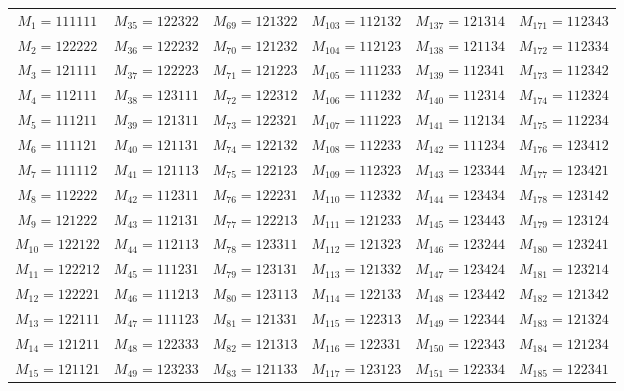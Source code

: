 \documentclass{svmult}
\begin{document}
\begin{center}
\begin{tabular}{cccccc} \hline
  $M_{1} = 111111$ &  $M_{35} = 122322$ &  $M_{69} = 121322$ & $M_{103} = 112132$ & $M_{137} = 121314$ & $M_{171} = 112343$ \\
  $M_{2} = 122222$ &  $M_{36} = 122232$ &  $M_{70} = 121232$ & $M_{104} = 112123$ & $M_{138} = 121134$ & $M_{172} = 112334$ \\
  $M_{3} = 121111$ &  $M_{37} = 122223$ &  $M_{71} = 121223$ & $M_{105} = 111233$ & $M_{139} = 112341$ & $M_{173} = 112342$ \\
  $M_{4} = 112111$ &  $M_{38} = 123111$ &  $M_{72} = 122312$ & $M_{106} = 111232$ & $M_{140} = 112314$ & $M_{174} = 112324$ \\
  $M_{5} = 111211$ &  $M_{39} = 121311$ &  $M_{73} = 122321$ & $M_{107} = 111223$ & $M_{141} = 112134$ & $M_{175} = 112234$ \\
  $M_{6} = 111121$ &  $M_{40} = 121131$ &  $M_{74} = 122132$ & $M_{108} = 112233$ & $M_{142} = 111234$ & $M_{176} = 123412$ \\
  $M_{7} = 111112$ &  $M_{41} = 121113$ &  $M_{75} = 122123$ & $M_{109} = 112323$ & $M_{143} = 123344$ & $M_{177} = 123421$ \\
  $M_{8} = 112222$ &  $M_{42} = 112311$ &  $M_{76} = 122231$ & $M_{110} = 112332$ & $M_{144} = 123434$ & $M_{178} = 123142$ \\
  $M_{9} = 121222$ &  $M_{43} = 112131$ &  $M_{77} = 122213$ & $M_{111} = 121233$ & $M_{145} = 123443$ & $M_{179} = 123124$ \\
 $M_{10} = 122122$ &  $M_{44} = 112113$ &  $M_{78} = 123311$ & $M_{112} = 121323$ & $M_{146} = 123244$ & $M_{180} = 123241$ \\
 $M_{11} = 122212$ &  $M_{45} = 111231$ &  $M_{79} = 123131$ & $M_{113} = 121332$ & $M_{147} = 123424$ & $M_{181} = 123214$ \\
 $M_{12} = 122221$ &  $M_{46} = 111213$ &  $M_{80} = 123113$ & $M_{114} = 122133$ & $M_{148} = 123442$ & $M_{182} = 121342$ \\
 $M_{13} = 122111$ &  $M_{47} = 111123$ &  $M_{81} = 121331$ & $M_{115} = 122313$ & $M_{149} = 122344$ & $M_{183} = 121324$ \\
 $M_{14} = 121211$ &  $M_{48} = 122333$ &  $M_{82} = 121313$ & $M_{116} = 122331$ & $M_{150} = 122343$ & $M_{184} = 121234$ \\
 $M_{15} = 121121$ &  $M_{49} = 123233$ &  $M_{83} = 121133$ & $M_{117} = 123123$ & $M_{151} = 122334$ & $M_{185} = 122341$ \\

\end{tabular}
\end{center}
\end{document}
